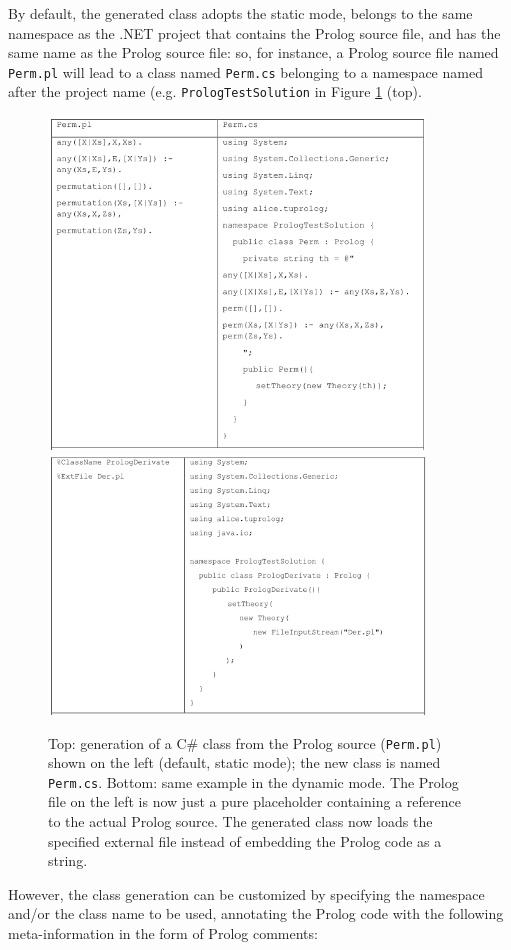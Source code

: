 By default, the generated class adopts the static mode, belongs to the same namespace as the .NET project that contains the Prolog source file, and has the same name as the Prolog source file: so, for instance, a Prolog source file named \texttt{Perm.pl} will lead to a class named \texttt{Perm.cs} belonging to a namespace named after the project name (e.g. \texttt{PrologTestSolution} in Figure \ref{fig:dotnet-codegen1and2} (top).
%
\begin{figure}
\centering
  \includegraphics[width=10cm]{images/dotnet-codegen1}\\
  \includegraphics[width=10cm]{images/dotnet-codegen2}
  \caption{Top: generation of a C\# class from the Prolog source (\texttt{Perm.pl}) shown on the left (default, static mode); the new class is named \texttt{Perm.cs}.
  Bottom: same example in the dynamic mode. The Prolog file on the left is now just a pure placeholder containing a reference to the actual Prolog source. The generated class now loads the specified external file instead of embedding the Prolog code as a string.
  }\label{fig:dotnet-codegen1and2}
\end{figure}
%
However, the class generation can be customized by specifying the namespace and/or the class name to be used, annotating the Prolog code with the following meta-information in the form of Prolog comments:

